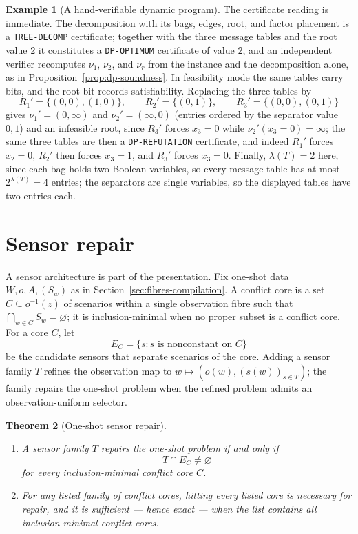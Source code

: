 \documentclass[11pt]{article}
\theoremstyle{plain}
\newtheorem{theorem}{Theorem}[section]
\theoremstyle{definition}
\newtheorem{example}[theorem]{Example}
\theoremstyle{remark}
\begin{document}
\begin{example}[A hand-verifiable dynamic program]
The certificate reading is immediate.  The decomposition with its bags,
edges, root, and factor placement is a \texttt{TREE-DECOMP} certificate;
together with the three message tables and the root value \(2\) it
constitutes a \texttt{DP-OPTIMUM} certificate of value \(2\), and an
independent verifier recomputes \(\nu_1\), \(\nu_2\), and \(\nu_r\) from
the instance and the decomposition alone, as in
Proposition~\ref{prop:dp-soundness}.  In feasibility mode the same tables
carry bits, and the root bit records satisfiability.  Replacing the three
tables by
\[
  R_1'=\{(0,0),(1,0)\},\qquad
  R_2'=\{(0,1)\},\qquad
  R_3'=\{(0,0),(0,1)\}
\]
gives \(\nu_1'=(0,\infty)\) and \(\nu_2'=(\infty,0)\) (entries ordered by
the separator value \(0,1\)) and an infeasible root, since \(R_3'\)
forces \(x_3=0\) while \(\nu_2'(x_3{=}0)=\infty\); the same three tables
are then a \texttt{DP-REFUTATION} certificate, and indeed \(R_1'\) forces
\(x_2=0\), \(R_2'\) then forces \(x_3=1\), and \(R_3'\) forces
\(x_3=0\).  Finally, \(\lambda(T)=2\) here, since each bag holds two
Boolean variables, so every message table has at most
\(2^{\lambda(T)}=4\) entries; the separators are single variables, so the
displayed tables have two entries each.
\end{example}

\section{Sensor repair}
\label{sec:sensor-repair}

A sensor architecture is part of the presentation.  Fix one-shot data
\(W,o,A,(S_w)\) as in Section~\ref{sec:fibres-compilation}.  A conflict core
is a set \(C\subseteq o^{-1}(z)\) of scenarios within a single observation
fibre such that \(\bigcap_{w\in C}S_w=\varnothing\); it is inclusion-minimal
when no proper subset is a conflict core.  For a core \(C\), let
\[
  E_C=\{s:s\text{ is nonconstant on }C\}
\]
be the candidate sensors that separate scenarios of the core.  Adding a
sensor family \(T\) refines the observation map to
\(w\mapsto(o(w),(s(w))_{s\in T})\); the family repairs the one-shot problem
when the refined problem admits an observation-uniform selector.

\begin{theorem}[One-shot sensor repair]
\label{thm:sensor-repair}
\leavevmode
\begin{enumerate}
\item A sensor family \(T\) repairs the one-shot problem if and only if
\[
  T\cap E_C\ne\varnothing
\]
for every inclusion-minimal conflict core \(C\).
\item For any listed family of conflict cores, hitting every listed core is
necessary for repair, and it is sufficient --- hence exact --- when the list
contains all inclusion-minimal conflict cores.
\end{enumerate}
\end{theorem}
\end{document}
